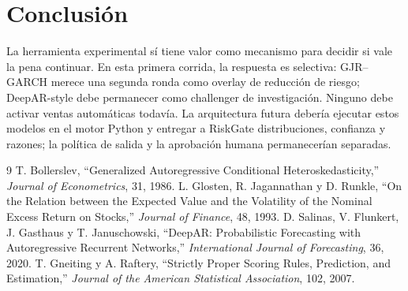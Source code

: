 \documentclass[11pt]{article}
\begin{document}
\section{Conclusión}
La herramienta experimental sí tiene valor como mecanismo para decidir si vale la pena continuar. En esta primera
corrida, la respuesta es selectiva: GJR--GARCH merece una segunda ronda como overlay de reducción de riesgo;
DeepAR-style debe permanecer como challenger de investigación. Ninguno debe activar ventas automáticas todavía.
La arquitectura futura debería ejecutar estos modelos en el motor Python y entregar a RiskGate distribuciones,
confianza y razones; la política de salida y la aprobación humana permanecerían separadas.

\begin{thebibliography}{9}
 T. Bollerslev, ``Generalized Autoregressive Conditional Heteroskedasticity,''
\emph{Journal of Econometrics}, 31, 1986.
 L. Glosten, R. Jagannathan y D. Runkle, ``On the Relation between the Expected Value and the
Volatility of the Nominal Excess Return on Stocks,'' \emph{Journal of Finance}, 48, 1993.
 D. Salinas, V. Flunkert, J. Gasthaus y T. Januschowski, ``DeepAR: Probabilistic Forecasting
with Autoregressive Recurrent Networks,'' \emph{International Journal of Forecasting}, 36, 2020.
 T. Gneiting y A. Raftery, ``Strictly Proper Scoring Rules, Prediction, and Estimation,''
\emph{Journal of the American Statistical Association}, 102, 2007.
\end{thebibliography}
\end{document}
